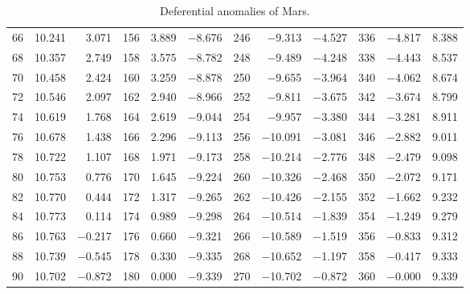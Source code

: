\begin{table}[!h]
{\begin{tabular}{rrr|rrr|rrr|rrr}
 66 &  10.241 &  3.071 & 156 &   3.889 & $-$8.676 & 246 &  $-$9.313 & $-$4.527 & 336 &  $-$4.817 &  8.388\\
 68 &  10.357 &  2.749 & 158 &   3.575 & $-$8.782 & 248 &  $-$9.489 & $-$4.248 & 338 &  $-$4.443 &  8.537\\
 70 &  10.458 &  2.424 & 160 &   3.259 & $-$8.878 & 250 &  $-$9.655 & $-$3.964 & 340 &  $-$4.062 &  8.674\\
 72 &  10.546 &  2.097 & 162 &   2.940 & $-$8.966 & 252 &  $-$9.811 & $-$3.675 & 342 &  $-$3.674 &  8.799\\
 74 &  10.619 &  1.768 & 164 &   2.619 & $-$9.044 & 254 &  $-$9.957 & $-$3.380 & 344 &  $-$3.281 &  8.911\\
 76 &  10.678 &  1.438 & 166 &   2.296 & $-$9.113 & 256 & $-$10.091 & $-$3.081 & 346 &  $-$2.882 &  9.011\\
 78 &  10.722 &  1.107 & 168 &   1.971 & $-$9.173 & 258 & $-$10.214 & $-$2.776 & 348 &  $-$2.479 &  9.098\\
 80 &  10.753 &  0.776 & 170 &   1.645 & $-$9.224 & 260 & $-$10.326 & $-$2.468 & 350 &  $-$2.072 &  9.171\\
 82 &  10.770 &  0.444 & 172 &   1.317 & $-$9.265 & 262 & $-$10.426 & $-$2.155 & 352 &  $-$1.662 &  9.232\\
 84 &  10.773 &  0.114 & 174 &   0.989 & $-$9.298 & 264 & $-$10.514 & $-$1.839 & 354 &  $-$1.249 &  9.279\\
 86 &  10.763 & $-$0.217 & 176 &   0.660 & $-$9.321 & 266 & $-$10.589 & $-$1.519 & 356 &  $-$0.833 &  9.312\\
 88 &  10.739 & $-$0.545 & 178 &   0.330 & $-$9.335 & 268 & $-$10.652 & $-$1.197 & 358 &  $-$0.417 &  9.333\\
 90 &  10.702 & $-$0.872 & 180 &   0.000 & $-$9.339 & 270 & $-$10.702 & $-$0.872 & 360 &  $-$0.000 &  9.339\\ 
\end{tabular}}
\caption{Deferential anomalies of Mars.}\label{vt9}
\end{table}

